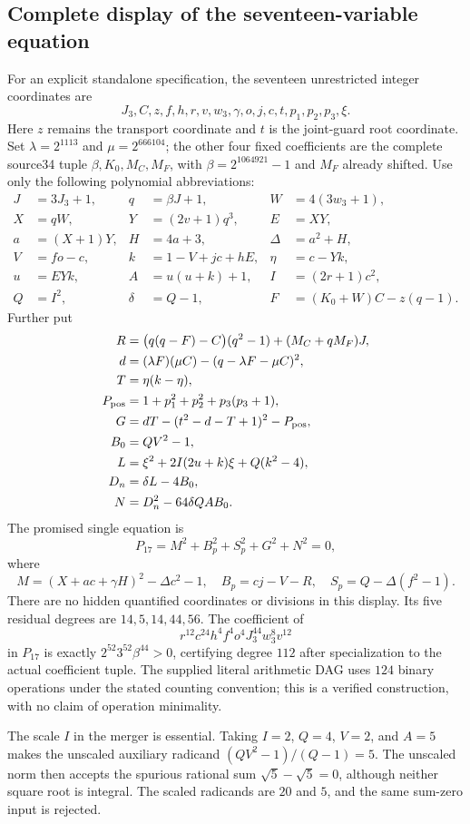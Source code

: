 \subsection{Complete display of the seventeen-variable equation}

For an explicit standalone specification, the seventeen unrestricted
integer coordinates are
\[
 J_3,C,z,f,h,r,v,w_3,\gamma,o,j,c,t,p_1,p_2,p_3,\xi.
\]
Here $z$ remains the transport coordinate and $t$ is the joint-guard
root coordinate. Set $\lambda=2^{1113}$ and $\mu=2^{666104}$; the other
four fixed coefficients are the complete source34 tuple
$\beta,K_0,M_C,M_F$, with $\beta=2^{1064921}-1$ and $M_F$ already shifted.
Use only the following polynomial abbreviations:
\begin{align*}
 J&=3J_3+1,&q&=\beta J+1,&W&=4(3w_3+1),\\
 X&=qW,&Y&=(2v+1)q^3,&E&=XY,\\
 a&=(X+1)Y,&H&=4a+3,&\Delta&=a^2+H,\\
 V&=fo-c,&k&=1-V+jc+hE,&\eta&=c-Yk,\\
 u&=EYk,&A&=u(u+k)+1,&I&=(2r+1)c^2,\\
 Q&=I^2,&\delta&=Q-1,&F&=(K_0+W)C-z(q-1).
\end{align*}
Further put
\begin{align*}
 R&=\bigl(q(q-F)-C\bigr)(q^2-1)+(M_C+qM_F)J,\\
 d&=(\lambda F)(\mu C)-(q-\lambda F-\mu C)^2,\\
 T&=\eta(k-\eta),\\
 P_{\rm pos}&=1+p_1^2+p_2^2+p_3(p_3+1),\\
 G&=dT-(t^2-d-T+1)^2-P_{\rm pos},\\
 B_0&=QV^2-1,\\
 L&=\xi^2+2I(2u+k)\xi+Q(k^2-4),\\
 D_n&=\delta L-4B_0,\\
 N&=D_n^2-64\delta QAB_0.
\end{align*}
The promised single equation is
\begin{equation}\label{eq:full17}
 \boxed{P_{17}=M^2+B_p^2+S_p^2+G^2+N^2=0,}
\end{equation}
where
\[
 M=(X+ac+\gamma H)^2-\Delta c^2-1,\quad
 B_p=cj-V-R,\quad S_p=Q-\Delta(f^2-1).
\]
There are no hidden quantified coordinates or divisions in this display.
Its five residual degrees are $14,5,14,44,56$. The coefficient of
\[
 r^{12}c^{24}h^4f^4o^4J_3^{44}w_3^8v^{12}
\]
in $P_{17}$ is exactly $2^{52}3^{52}\beta^{44}>0$, certifying degree
$112$ after specialization to the actual coefficient tuple. The supplied
literal arithmetic DAG uses $124$ binary operations under the stated
counting convention; this is a verified construction, with no claim of
operation minimality.

The scale $I$ in the merger is essential. Taking $I=2$, $Q=4$, $V=2$,
and $A=5$ makes the unscaled auxiliary radicand
$(QV^2-1)/(Q-1)=5$. The unscaled norm then accepts the spurious rational
sum $\sqrt5-\sqrt5=0$, although neither square root is integral. The
scaled radicands are $20$ and $5$, and the same sum-zero input is rejected.
